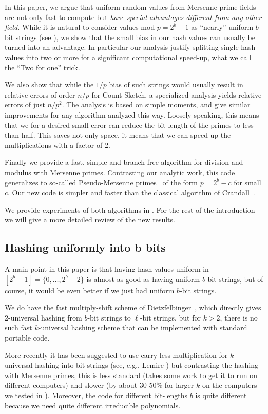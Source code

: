 In this paper, we argue that uniform random values from Mersenne prime fields
are not only fast to compute but
\emph{have special advantages different from any other field.}
While it is natural to consider values mod $p=2^b-1$ as ``nearly'' uniform $b$-bit strings
(see ),
we show that the small bias in our hash values can usually be turned into an advantage.
In particular our analysis justify splitting single hash values into two or more for a significant computational speed-up, what we call the ``Two for one'' trick.

We also show that while the $1/p$ bias of such strings would usually result in relative errors of order $n/p$ for Count Sketch, a specialized analysis yields relative errors of just $n/p^2$.
The analysis is based on simple moments, and give similar improvements for any algorithm analyzed this way.
Loosely speaking, this means that we for a desired small error can reduce
the bit-length of the primes to less than half. This saves not only
space, it means that we can speed up the multiplications
with a factor of 2.

Finally we provide a fast, simple and branch-free algorithm for division and modulus with Mersenne primes.
Contrasting our analytic work, this code generalizes to so-called Pseudo-Mersenne primes~\cite{van2014encyclopedia} of the form $p=2^b-c$ for small $c$.
Our new code is simpler and faster than the classical algorithm of Crandall~\cite{crandall1992method}.

We provide experiments of both algorithms in .
For the rest of the introduction we will give a more detailed review of the new results.

\subsection{Hashing uniformly into b bits}\label{sec:b-bit?}
A main point in this paper is that having hash values uniform in $[2^b-1]=\{0,\dots,2^b-2\}$
is almost as good as having uniform $b$-bit strings, but of course,
it would be even better if we just had uniform $b$-bit strings.

We do have the fast multiply-shift scheme of Dietzfelbinger~\cite{dietzfel96universal}, which directly gives 2-universal
hashing from $b$-bit strings to $\ell$-bit strings, but for $k>2$,
there is no such fast $k$-universal hashing scheme that
can be implemented with standard portable code.

More recently it has been suggested to use carry-less multiplication
for $k$-universal hashing into bit strings (see, e.g., Lemire
\cite{lemire2014strongly}) but contrasting the hashing with Mersenne primes,
this is less standard (takes some work to get it to run on different
computers) and slower (by about 30-50\% for larger $k$ on the computers we tested in ).
Moreover, the code for different bit-lengths $b$ is quite different
because we need quite different irreducible polynomials.

